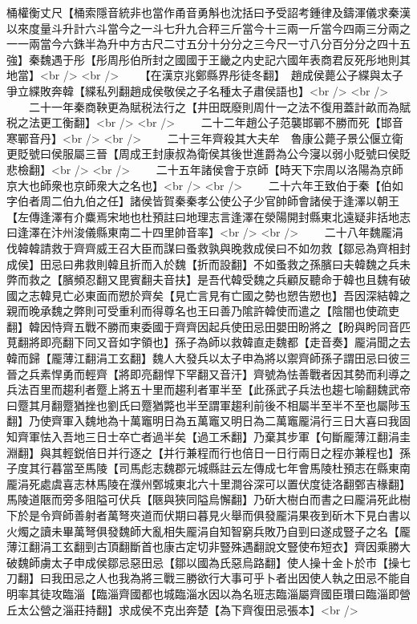 桶權衡丈尺【桶索隱音統非也當作甬音勇斛也沈括曰予受詔考鍾律及鑄渾儀求秦漢以來度量斗升計六斗當今之一斗七升九合秤三斤當今十三兩一斤當今四兩三分兩之一一兩當今六銖半為升中方古尺二寸五分十分分之三今尺一寸八分百分分之四十五強】秦魏遇于彤【彤周彤伯所封之國國于王畿之内史記六國年表商君反死彤地則其地當】<br />
<br />
　　【在漢京兆鄭縣界彤徒冬翻】　趙成侯薨公子緤與太子爭立緤敗奔韓【緤私列翻趙成侯敬侯之子名種太子肅侯語也】<br />
<br />
　　二十一年秦商鞅更為賦税法行之【井田既廢則周什一之法不復用蓋計畝而為賦税之法更工衡翻】<br />
<br />
　　二十二年趙公子范襲邯鄲不勝而死【邯音寒鄲音丹】<br />
<br />
　　二十三年齊殺其大夫牟　魯康公薨子景公偃立衛更貶號曰侯服屬三晉【周成王封康叔為衛侯其後世進爵為公今寖以弱小貶號曰侯貶悲檢翻】<br />
<br />
　　二十五年諸侯會于京師【時天下宗周以洛陽為京師京大也師衆也京師衆大之名也】<br />
<br />
　　二十六年王致伯于秦【伯如字伯者周二伯九伯之任】諸侯皆賀秦秦孝公使公子少官帥師會諸侯于逢澤以朝王【左傳逢澤有介麋焉宋地也杜預註曰地理志言逢澤在滎陽開封縣東北遠疑非括地志曰逢澤在汴州浚儀縣東南二十四里帥音率】<br />
<br />
　　二十八年魏龎涓伐韓韓請救于齊齊威王召大臣而謀曰蚤救孰與晚救成侯曰不如勿救【鄒忌為齊相封成侯】田忌曰弗救則韓且折而入於魏【折而設翻】不如蚤救之孫臏曰夫韓魏之兵未弊而救之【臏頻忍翻又毘賓翻夫音扶】是吾代韓受魏之兵顧反聽命于韓也且魏有破國之志韓見亡必東面而愬於齊矣【見亡言見有亡國之勢也愬告愬也】吾因深結韓之親而晚承魏之弊則可受重利而得尊名也王曰善乃隂許韓使而遣之【陰闇也使疏吏翻】韓因恃齊五戰不勝而東委國于齊齊因起兵使田忌田嬰田盼將之【盼與盻同音匹莧翻將即亮翻下同又音如字領也】孫子為師以救韓直走魏都【走音奏】龎涓聞之去韓而歸【龎薄江翻涓工玄翻】魏人大發兵以太子申為將以禦齊師孫子謂田忌曰彼三晉之兵素悍勇而輕齊【將即亮翻悍下罕翻又音汗】齊號為怯善戰者因其勢而利導之兵法百里而趨利者蹷上將五十里而趨利者軍半至【此孫武子兵法也趨七喻翻魏武帝曰蹷其月翻蹷猶挫也劉氏曰蹷猶斃也半至謂軍趨利前後不相屬半至半不至也屬陟玉翻】乃使齊軍入魏地為十萬竈明日為五萬竈又明日為二萬竈龎涓行三日大喜曰我固知齊軍怯入吾地三日士卒亡者過半矣【過工禾翻】乃棄其步軍【句斷龎薄江翻涓圭淵翻】與其輕鋭倍日并行逐之【并行兼程而行也倍日一日行兩日之程亦兼程也】孫子度其行暮當至馬陵【司馬彪志魏郡元城縣註云左傳成七年會馬陵杜預志在縣東南龎涓死處虞喜志林馬陵在濮州鄄城東北六十里澗谷深可以置伏度徒洛翻鄄吉椽翻】馬陵道陿而旁多阻隘可伏兵【陿與狹同隘烏懈翻】乃斫大樹白而書之曰龎涓死此樹下於是令齊師善射者萬弩夾道而伏期曰暮見火舉而俱發龎涓果夜到斫木下見白書以火燭之讀未畢萬弩俱發魏師大亂相失龎涓自知智窮兵敗乃自剄曰遂成豎子之名【龎薄江翻涓工玄翻剄古頂翻斷首也康古定切非豎殊遇翻說文豎使布短衣】齊因乘勝大破魏師虜太子申成侯鄒忌惡田忌【鄒以國為氏惡烏路翻】使人操十金卜於市【操七刀翻】曰我田忌之人也我為將三戰三勝欲行大事可乎卜者出因使人執之田忌不能自明率其徒攻臨淄【臨淄齊國都也城臨淄水因以為名班志臨淄屬齊國臣瓚曰臨淄即營丘太公營之淄莊持翻】求成侯不克出奔楚【為下齊復田忌張本】<br />
